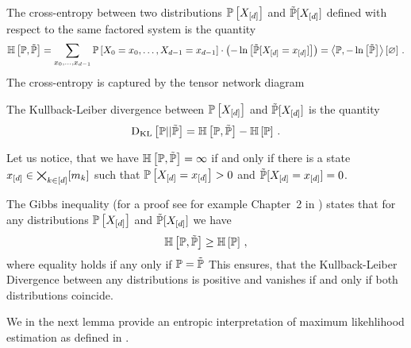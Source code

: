 \begin{definition}
    \label{def:crossEntropy}
    The cross-entropy between two distributions $\mathbb{P}\left[X_{[d]}\right]$ and $\tilde{\mathbb{P}}[X_{[d]}]$ defined with respect to the same factored system is the quantity
    \begin{align*}
        \mathbb{H}\left[\mathbb{P},\tilde{\mathbb{P}}\right]
        = \sum_{x_{0},\ldots,x_{d-1}}  \mathbb{P}\left[X_{0}=x_{0},\ldots,X_{d-1}=x_{d-1}\right] \cdot \left(-\ln \left[ \tilde{\mathbb{P}}[X_{[d]}=x_{[d]}] \right]\right)
        = \left\langle \mathbb{P},-\ln \left[ \tilde{\mathbb{P}} \right]\right\rangle \left[ \varnothing \right] \, .
    \end{align*}
    The cross-entropy is captured by the tensor network diagram
    \begin{center}
        
    \end{center}
    The Kullback-Leiber divergence between $\mathbb{P}\left[X_{[d]}\right]$ and $\tilde{\mathbb{P}}[X_{[d]}]$ is the quantity
    \begin{align*}
        \mathrm{D}_{\mathrm{KL}}\left[ \mathbb{P} || \tilde{\mathbb{P}} \right] = \mathbb{H}\left[\mathbb{P},\tilde{\mathbb{P}}\right] - \mathbb{H}\left[\mathbb{P}\right]  \, .
    \end{align*}
\end{definition}

Let us notice, that we have $\mathbb{H}\left[\mathbb{P},\tilde{\mathbb{P}}\right] = \infty$ if and only if there is a state $x_{[d]}\in\bigtimes_{k\in[d]}[m_{k}]$ such that $\mathbb{P}\left[X_{[d]}=x_{[d]}\right]>0$ and $\tilde{\mathbb{P}}[X_{[d]}=x_{[d]}]=0$.

The Gibbs inequality (for a proof see for example Chapter~2 in \cite{cover_elements_2006}) states that for any distributions $\mathbb{P}\left[X_{[d]}\right]$ and $\tilde{\mathbb{P}}[X_{[d]}]$ we have
\begin{align*}
    \mathbb{H}\left[\mathbb{P},\tilde{\mathbb{P}}\right] \geq \mathbb{H}\left[\mathbb{P}\right] \, ,
\end{align*}
where equality holds if any only if $\mathbb{P}=\tilde{\mathbb{P}}$
This ensures, that the Kullback-Leiber Divergence between any distributions is positive and vanishes if and only if both distributions coincide.

We in the next lemma provide an entropic interpretation of maximum likehlihood estimation as defined in .


